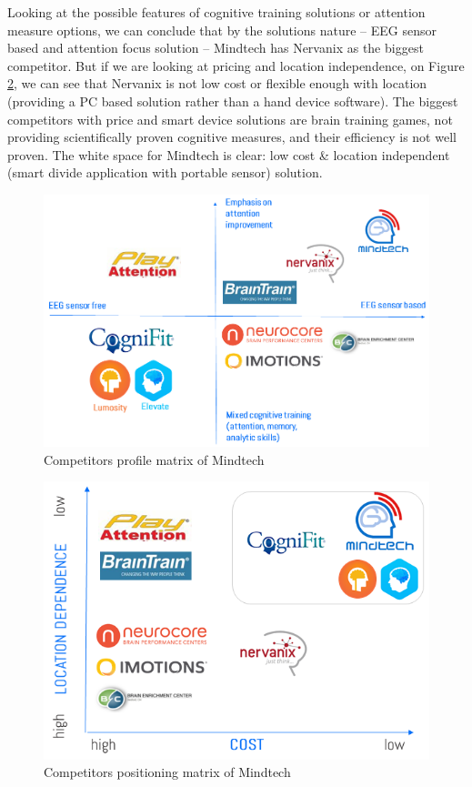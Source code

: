 \documentclass[letterpaper,10pt]{article}
\begin{document}
Looking at the possible features of cognitive training solutions or attention measure options, we can conclude that by the solutions nature – EEG sensor based and attention focus solution – Mindtech has Nervanix as the biggest competitor. But if we are looking at pricing and location independence, on Figure \ref{img:comp_pos}, we can see that Nervanix is not low cost or flexible enough with location (providing a PC based solution rather than a hand device software). The biggest competitors with price and smart device solutions are brain training games, not providing scientifically proven cognitive measures, and their efficiency is not well proven. The white space for Mindtech is clear: low cost & location independent (smart divide application with portable sensor) solution.


\begin{figure}[hbt!]
\centering
\includegraphics[scale=0.5]{map_comp.png}
\caption{Competitors profile matrix of Mindtech}
\label{img:comp_map}
\end{figure}

\begin{figure}[hbt!]
\centering
\includegraphics[scale=0.7]{comp_pos.png}
\caption{Competitors positioning matrix of Mindtech}
\label{img:comp_pos}
\end{figure}
\end{document}
